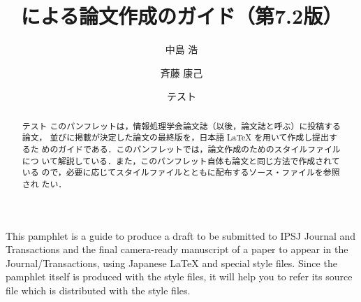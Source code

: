 \title[{\protect\LaTeX} による論文作成のガイド]%
	{{\protect\LATEX} による論文作成のガイド（第7.2版）}
\author{中島 浩\and
	斉藤 康己 \and テスト}
	

\begin{abstract}
テスト
このパンフレットは，情報処理学会論文誌（以後，論文誌と呼ぶ）に投稿する論文，
並びに掲載が決定した論文の最終版を，日本語 {\LaTeX} を用いて作成し提出するた
めのガイドである．このパンフレットでは，論文作成のためのスタイルファイルにつ
いて解説している．また，このパンフレット自体も論文と同じ方法で作成されている
ので，必要に応じてスタイルファイルとともに配布するソース・ファイルを参照され
たい．
\end{abstract}
\begin{eabstract}
This pamphlet is a guide to produce a draft to be submitted to IPSJ Journal
and Transactions and the final camera-ready manuscript of a paper to appear
in the Journal\slash Transactions, using Japanese {\LaTeX} and special style
files.  Since the pamphlet itself is produced with the style files, it will
help you to refer its source file which is distributed with the style files.
\end{eabstract}

\maketitle